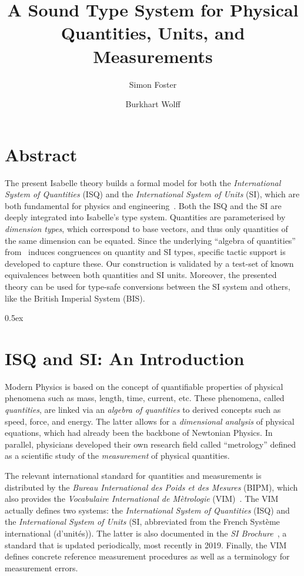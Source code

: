 \documentclass[11pt,a4paper]{book}
\begin{document}
\title{A Sound Type System for Physical \\ Quantities, Units, and Measurements}
\author{Simon Foster \and Burkhart Wolff}

\maketitle

\chapter*{Abstract}
The present Isabelle theory builds a formal model for both the \emph{International System of Quantities} (ISQ) and the
\emph{International System of Units} (SI), which are both fundamental for physics and
engineering~\cite{bipm-jcgm:2012:VIM}. Both the ISQ and the SI are deeply integrated into Isabelle's type
system. Quantities are parameterised by \emph{dimension types}, which correspond to base vectors, and thus only
quantities of the same dimension can be equated. Since the underlying ``algebra of quantities''
from~\cite{bipm-jcgm:2012:VIM} induces congruences on quantity and SI types, specific tactic support is developed
to capture these. Our construction is validated by a test-set of known equivalences between both quantities and SI
units. Moreover, the presented theory can be used for type-safe conversions between the SI system and others, like the
British Imperial System (BIS).

\tableofcontents

\parindent 0pt\parskip 0.5ex


\chapter{ISQ and SI: An Introduction}

Modern Physics is based on the concept of quantifiable properties of physical phenomena such 
as mass, length, time, current, etc. These phenomena, called \emph{quantities}, are linked via an 
\emph{algebra of quantities} to derived concepts such as speed, force, and energy. The latter 
allows for a \emph{dimensional analysis} of physical equations, which had already been the 
backbone of Newtonian Physics. In parallel, physicians developed their own research field called 
``metrology'' defined as a scientific study of the \emph{measurement} of physical quantities.

The relevant international standard for quantities and measurements is distributed by the \emph{Bureau International des
  Poids et des Mesures} (BIPM), which also provides the \emph{Vocabulaire International de M\`etrologie}
(VIM)~\cite{bipm-jcgm:2012:VIM}.  The VIM actually defines two systems: the \emph{International System of Quantities}
(ISQ) and the \emph{International System of Units} (SI, abbreviated from the French Syst\`eme international
(d’unit\'es)). The latter is also documented in the \emph{SI Brochure}~\cite{SI-Brochure}, a standard that is updated
periodically, most recently in 2019. Finally, the VIM defines concrete reference measurement procedures as well as a
terminology for measurement errors.
\end{document}
